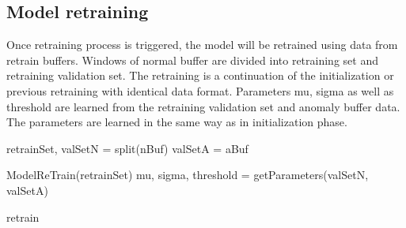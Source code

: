 \subsection{Model retraining}
\label{retraining}

Once retraining process is triggered, the model will be retrained using data from retrain buffers. Windows of normal buffer are divided into retraining set and retraining validation set. The retraining is a continuation of the initialization or previous retraining with identical data format. Parameters mu, sigma as well as threshold are learned from the retraining validation set and anomaly buffer data. The parameters are learned in the same way as in initialization phase.

\begin{algorithm}[h]

\BlankLine 
retrainSet, valSetN = split(nBuf)\;
valSetA = aBuf\;

ModelReTrain(retrainSet)\;
mu, sigma, threshold = getParameters(valSetN, valSetA)

\caption{retrain}
\label{alg:retrain}
\end{algorithm}




